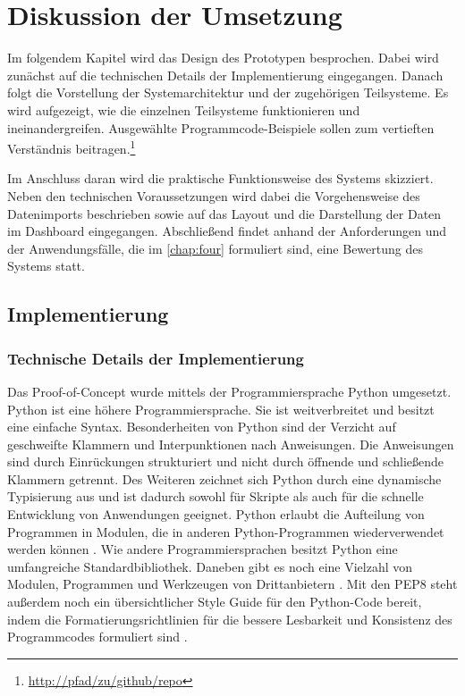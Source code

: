\chapter{Diskussion der Umsetzung}
\label{chap:five}
Im folgendem Kapitel wird das Design des Prototypen besprochen. Dabei wird zunächst auf die technischen Details der
Implementierung eingegangen. Danach folgt die Vorstellung der Systemarchitektur und der zugehörigen Teilsysteme.
Es wird aufgezeigt, wie die einzelnen Teilsysteme funktionieren und ineinandergreifen. Ausgewählte Programmcode-Beispiele sollen zum  
vertieften Verständnis beitragen.\footnote{\url{http://pfad/zu/github/repo}}

Im Anschluss daran wird die praktische Funktionsweise des Systems skizziert. Neben den technischen Voraussetzungen wird dabei 
die Vorgehensweise des Datenimports beschrieben sowie auf das Layout und die Darstellung der Daten im Dashboard eingegangen. 
Abschließend findet anhand der Anforderungen und der Anwendungsfälle, die im \autoref{chap:four} formuliert sind, eine Bewertung des Systems statt.


\section{Implementierung}
    
    \subsection{Technische Details der Implementierung}
    Das Proof-of-Concept wurde mittels der Programmiersprache Python umgesetzt.
    Python ist eine höhere Programmiersprache. Sie ist weitverbreitet \cite[vgl.][]{loukides_where_2021} und besitzt
    eine einfache Syntax. Besonderheiten von Python sind der Verzicht auf geschweifte Klammern und Interpunktionen nach Anweisungen.
    Die Anweisungen sind durch Einrückungen strukturiert und nicht durch öffnende und schließende Klammern
    getrennt. Des Weiteren zeichnet sich Python durch eine dynamische Typisierung aus und ist dadurch sowohl für Skripte als auch 
    für die schnelle Entwicklung von Anwendungen geeignet. Python erlaubt die Aufteilung von Programmen in Modulen, die in anderen Python-Programmen wiederverwendet werden können
    \cite[vgl.][]{python_6_2021}.
    Wie andere Programmiersprachen besitzt Python eine umfangreiche Standardbibliothek.
    Daneben gibt es noch eine Vielzahl von Modulen, Programmen und Werkzeugen von Drittanbietern \cite[vgl.][]{python_pypi_2021}.
    Mit den \acrfull{PEP8} steht außerdem noch ein übersichtlicher Style Guide für den Python-Code bereit, indem die Formatierungsrichtlinien für die bessere Lesbarkeit und Konsistenz des Programmcodes formuliert sind \cite[vgl.][]{rossum_pep_2021}.

